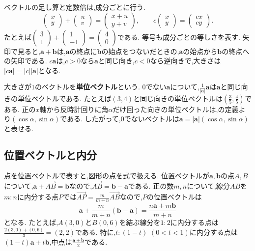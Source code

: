 ベクトルの足し算と定数倍は,成分ごとに行う.
\[
  \begin{pmatrix}x\\y\end{pmatrix}
  +\begin{pmatrix}u\\v\end{pmatrix}
  =\begin{pmatrix}x+u\\y+v\end{pmatrix},
  \qquad
  c\begin{pmatrix}x\\y\end{pmatrix}
  =\begin{pmatrix}cx\\cy\end{pmatrix}.
\]
たとえば$\begin{pmatrix}3\\1\end{pmatrix}+\begin{pmatrix}1\\-1\end{pmatrix}=\begin{pmatrix}4\\0\end{pmatrix}$である.
等号も成分ごとの等しさを表す.
矢印で見ると,$\boldsymbol a+\boldsymbol b$は,$\boldsymbol a$の終点に$\boldsymbol b$の始点をつないだときの,$\boldsymbol a$の始点から$\boldsymbol b$の終点への矢印である.
$c\boldsymbol a$は,$c>0$なら$\boldsymbol a$と同じ向き,$c<0$なら逆向きで,大きさは$|c\boldsymbol a|=|c||\boldsymbol a|$となる.

大きさが$1$のベクトルを\textbf{単位ベクトル}という.
0でない$\boldsymbol a$について,$\frac{1}{|\boldsymbol a|}\boldsymbol a$は$\boldsymbol a$と同じ向きの単位ベクトルである.
たとえば$(3,4)$と同じ向きの単位ベクトルは$\left(\frac35,\frac45\right)$である.
正の$x$軸から反時計回りに角$\alpha$だけ回った向きの単位ベクトルは,の定義より$(\cos\alpha,\sin\alpha)$である.
したがって,0でないベクトルは$\boldsymbol a=|\boldsymbol a|(\cos\alpha,\sin\alpha)$と表せる.

\subsection{位置ベクトルと内分}\label{節：位置ベクトルと内分}
点を位置ベクトルで表すと,図形の点を式で扱える.
位置ベクトルが$\boldsymbol a,\boldsymbol b$の点$A,B$について,$\boldsymbol a+\overrightarrow{AB}=\boldsymbol b$なので,$\overrightarrow{AB}=\boldsymbol b-\boldsymbol a$である.
正の数$m,n$について,線分$AB$を$m:n$に内分する点$P$では$\overrightarrow{AP}=\frac{m}{m+n}\overrightarrow{AB}$なので,$P$の位置ベクトルは
\[
  \boldsymbol a+\frac{m}{m+n}(\boldsymbol b-\boldsymbol a)
  =\frac{n\boldsymbol a+m\boldsymbol b}{m+n}
\]
となる.
たとえば,$A(3,0)$と$B(0,6)$を結ぶ線分を$1:2$に内分する点は$\frac{2(3,0)+(0,6)}{3}=(2,2)$である.
特に,$t:(1-t)$ $(0<t<1)$に内分する点は$(1-t)\boldsymbol a+t\boldsymbol b$,中点は$\frac{\boldsymbol a+\boldsymbol b}{2}$である.

